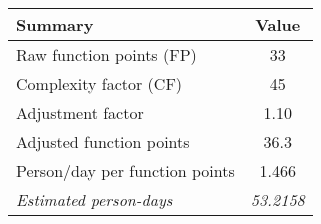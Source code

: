 \begin{tabular}{l|c}
\textbf{Summary} & \textbf{Value} \\ \hline
Raw function points (FP) & 33 \\
Complexity factor (CF) & 45 \\
Adjustment factor & 1.10 \\
Adjusted function points & 36.3 \\
Person/day per function points & 1.466 \\ \hline
\textit{Estimated person-days} & \textit{53.2158}
\end{tabular}
